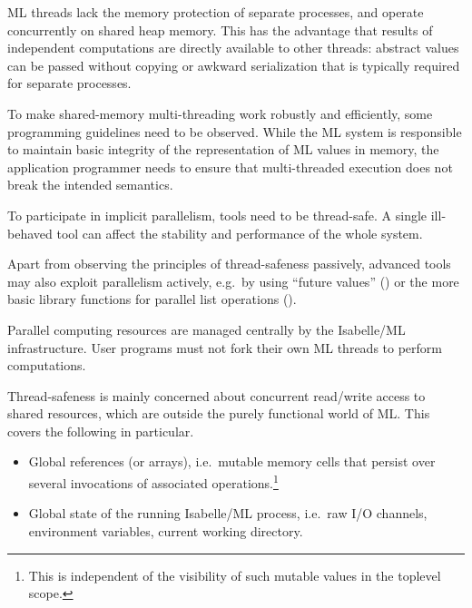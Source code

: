 \begin{isabellebody}
\begin{isamarkuptext}
  \medskip ML threads lack the memory protection of separate
  processes, and operate concurrently on shared heap memory.  This has
  the advantage that results of independent computations are directly
  available to other threads: abstract values can be passed without
  copying or awkward serialization that is typically required for
  separate processes.

  To make shared-memory multi-threading work robustly and efficiently,
  some programming guidelines need to be observed.  While the ML
  system is responsible to maintain basic integrity of the
  representation of ML values in memory, the application programmer
  needs to ensure that multi-threaded execution does not break the
  intended semantics.

  \begin{warn}
  To participate in implicit parallelism, tools need to be
  thread-safe.  A single ill-behaved tool can affect the stability and
  performance of the whole system.
  \end{warn}

  Apart from observing the principles of thread-safeness passively,
  advanced tools may also exploit parallelism actively, e.g.\ by using
  ``future values'' () or the more basic library
  functions for parallel list operations ().

  \begin{warn}
  Parallel computing resources are managed centrally by the
  Isabelle/ML infrastructure.  User programs must not fork their own
  ML threads to perform computations.
  \end{warn}%
\end{isamarkuptext}%
\isamarkuptrue%
%
\isamarkuptrue%
%
\begin{isamarkuptext}%
Thread-safeness is mainly concerned about concurrent
  read/write access to shared resources, which are outside the purely
  functional world of ML.  This covers the following in particular.

  \begin{itemize}

  \item Global references (or arrays), i.e.\ mutable memory cells that
  persist over several invocations of associated
  operations.\footnote{This is independent of the visibility of such
  mutable values in the toplevel scope.}

  \item Global state of the running Isabelle/ML process, i.e.\ raw I/O
  channels, environment variables, current working directory.


\end{itemize}
\end{isamarkuptext}
\end{isabellebody}
